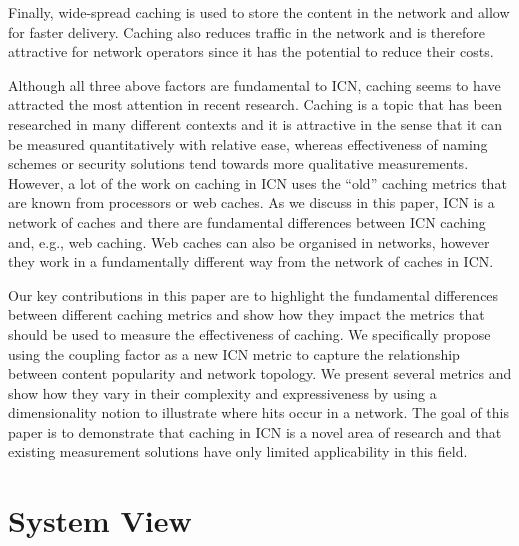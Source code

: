 \documentclass{sigcomm-alternate}
\begin{document}
Finally, wide-spread caching is used to store the content in the network and allow for faster delivery.
Caching also reduces traffic in the network and is therefore attractive for network operators since it has the potential to reduce their costs.

Although all three above factors are fundamental to ICN, caching seems to have attracted the most attention in recent research.
Caching is a topic that has been researched in many different contexts and it is attractive in the sense that it can be measured quantitatively with relative ease, whereas effectiveness of naming schemes or security solutions tend towards more qualitative measurements.
However, a lot of the work on caching in ICN uses the ``old'' caching metrics that are known from processors or web caches.
As we discuss in this paper, ICN is a network of caches and there are fundamental differences between ICN caching and, e.g., web caching.
Web caches can also be organised in networks, however they work in a fundamentally different way from the network of caches in ICN.

Our key contributions in this paper are to highlight the fundamental differences between different caching metrics and show how they impact the metrics that should be used to measure the effectiveness of caching.
We specifically propose using the coupling factor as a new ICN metric to capture the relationship between content popularity and network topology.
We present several metrics and show how they vary in their complexity and expressiveness by using a dimensionality notion to illustrate where hits occur in a network.
The goal of this paper is to demonstrate that caching in ICN is a novel area of research and that existing measurement solutions have only limited applicability in this field.




\section{System View}
\label{sec:system-view}
\end{document}
